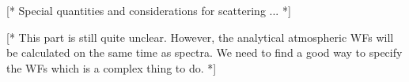 \label{sec:fm_defs:scattering}

[* Special quantities and considerations for scattering ... *]



\label{sec:fm_defs:wfs}

[* This part is still quite unclear. However, the analytical
atmospheric WFs will be calculated on the same time as spectra. We
need to find a good way to specify the WFs which is a complex thing to
do. *]


